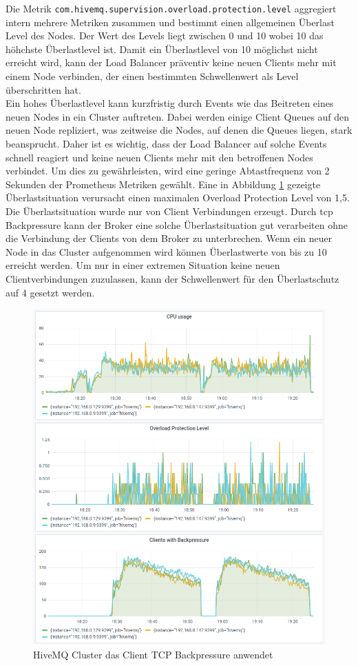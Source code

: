 Die Metrik \verb|com.hivemq.supervision.overload.protection.level| aggregiert intern mehrere Metriken zusammen und bestimmt einen allgemeinen Überlast Level des Nodes. Der Wert des Levels liegt zwischen 0 und 10 wobei 10 das höhchste Überlastlevel ist.
Damit ein Überlastlevel von 10 möglichst nicht erreicht wird, kann der Load Balancer präventiv keine neuen Clients mehr mit einem Node verbinden, der einen bestimmten Schwellenwert als Level überschritten hat.
\\
Ein hohes Überlastlevel kann kurzfristig durch Events wie das Beitreten eines neuen Nodes in ein Cluster auftreten. Dabei werden einige Client Queues auf den neuen Node repliziert, was zeitweise die Nodes, auf denen die Queues liegen, stark beansprucht. Daher ist es wichtig, dass der Load Balancer auf solche Events schnell reagiert und keine neuen Clients mehr mit den betroffenen Nodes verbindet.
Um dies zu gewährleisten, wird eine geringe Abtastfrequenz von 2 Sekunden der Prometheus Metriken gewählt.
Eine in Abbildung \ref{fig:overload-protection} gezeigte Überlastsituation verursacht einen maximalen Overload Protection Level von 1,5. Die Überlastsituation wurde nur von Client Verbindungen erzeugt. Durch \ac{tcp} Backpressure kann der Broker eine solche Überlastsituation gut verarbeiten ohne die Verbindung der Clients von dem Broker zu unterbrechen. Wenn ein neuer Node in das Cluster aufgenommen wird können Überlastwerte von bis zu 10 erreicht werden. Um nur in einer extremen Situation keine neuen Clientverbindungen zuzulassen, kann der Schwellenwert für den Überlastschutz auf 4 gesetzt werden.
\\
\begin{figure}
    \centering
    \includegraphics[scale=0.8]{images/overload-protection.png}
    \caption{HiveMQ Cluster das Client TCP Backpressure anwendet}
    \label{fig:overload-protection}
\end{figure}
